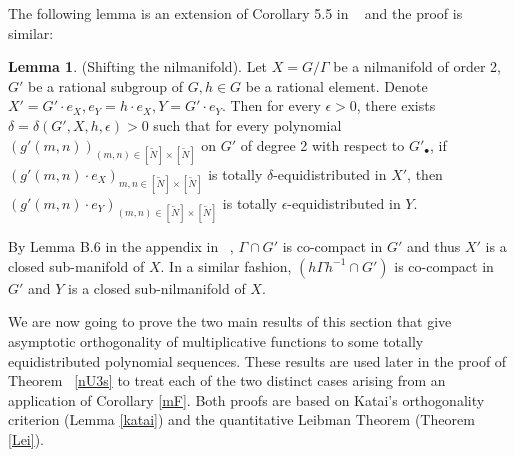 \documentclass[12pt,amstex]{amsart}
\theoremstyle{definition}
\newtheorem{lem}[thm]{Lemma}
\def \d {\delta}
\def \e {\epsilon}
\begin{document}
The following lemma is an extension of Corollary 5.5 in ~\cite{FH} and the proof is similar:
\begin{lem}\label{shift}(Shifting the nilmanifold).
  Let $X=G/\Gamma$ be a nilmanifold of order 2, $G'$ be a rational subgroup
 of $G, h\in G$ be a rational element. Denote
 $X'=G'\cdot e_{X}, e_{Y}=h\cdot e_{X}, Y=G'\cdot e_{Y}$.
Then for every $\e>0$, there exists $\d=\d(G',X,h,\e)>0$ such
that for every polynomial $(g'(m,n))_{(m,n)\in[\tilde{N}]\times[\tilde{N}]}$ on
$G'$ of degree 2 with respect to $G'_{\bullet}$, if $(g'(m,n)\cdot e_{X})_{{m,n}\in[\tilde{N}]\times[\tilde{N}]}$ is totally $\d$-equidistributed in $X'$, then $(g'(m,n)\cdot e_{Y})_{(m,n)\in[\tilde{N}]\times[\tilde{N}]}$ is totally $\e$-equidistributed in $Y$.
\end{lem}

By Lemma B.6 in the appendix in ~\cite{FH}, $\Gamma\cap G'$ is co-compact in $G'$ and thus
$X'$ is a closed sub-manifold of $X$. In a similar fashion, $(h\Gamma h^{-1}\cap G')$
is co-compact in $G'$ and $Y$ is a closed sub-nilmanifold of $X$.

We are now going to prove the two main results of this section that give asymptotic orthogonality
of multiplicative functions to some totally equidistributed polynomial sequences. These results
are used later in the proof of Theorem ~\ref{nU3s} to treat each of the two distinct cases arising
from an application of Corollary \ref{mF}. Both proofs are based on Katai's orthogonality
criterion (Lemma \ref{katai}) and the quantitative Leibman Theorem (Theorem \ref{Lei}).
\end{document}
